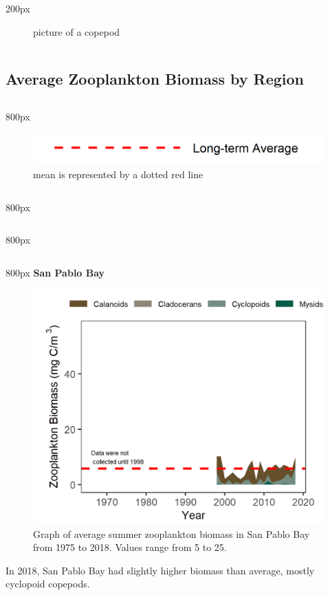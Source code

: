 \documentclass[
]{book}
\begin{document}
\begin{column}{200px\textwidth}
\begin{figure}
{}

\caption{picture of a copepod}\label{fig:unnamed-chunk-68}
\end{figure}
\end{column}

\hypertarget{average-zooplankton-biomass-by-region-1}{%
\subsection{Average Zooplankton Biomass by Region}\label{average-zooplankton-biomass-by-region-1}}

\begin{column}{800px\textwidth}
\begin{figure}
\includegraphics[width=15.25in]{figures/mline} \caption{mean is represented by a dotted red line}\label{fig:unnamed-chunk-69}
\end{figure}
\end{column}

\begin{column}{800px\textwidth}
\end{column}

\begin{column}{800px\textwidth}
\end{column}

\begin{column}{800px\textwidth}
\textbf{San Pablo Bay}

\begin{figure}
\includegraphics[width=15.25in]{figures/zoops_splsummer} \caption{Graph of average summer zooplankton biomass in San Pablo Bay from 1975 to 2018. Values range from 5 to 25.}\label{fig:unnamed-chunk-70}
\end{figure}

In 2018, San Pablo Bay had slightly higher biomass than average, mostly cyclopoid copepods.
\end{column}
\end{document}
